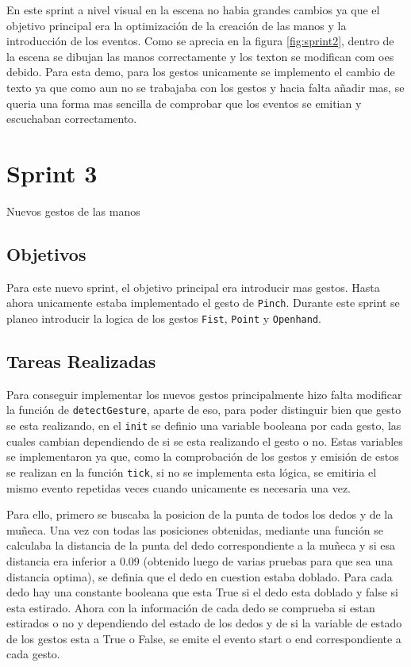 \documentclass[a4paper, 12pt]{book}
\begin{document}
En este sprint a nivel visual en la escena no habia grandes cambios ya que el objetivo principal era la optimización de la creación de las manos y la introducción de los eventos. 
Como se aprecia en la figura \ref{fig:sprint2}, dentro de la escena se dibujan las manos correctamente y los texton se modifican com oes debido. Para esta demo, para los gestos unicamente se implemento el cambio de texto ya que 
como aun no se trabajaba con los gestos y hacia falta añadir mas, se queria una forma mas sencilla de comprobar que los eventos se emitian y escuchaban correctamento. 

\section{Sprint 3}
\label{sec:sprint3}
Nuevos gestos de las manos

\subsection{Objetivos}
\label{subsec:objetivo-principal3}
Para este nuevo sprint, el objetivo principal era introducir mas gestos. Hasta ahora unicamente estaba implementado el gesto de \texttt{Pinch}.
Durante este sprint se planeo introducir la logica de los gestos \texttt{Fist}, \texttt{Point} y \texttt{Openhand}.

\subsection{Tareas Realizadas}
\label{subsec:implementacion3}
Para conseguir implementar los nuevos gestos principalmente hizo falta modificar la función de \texttt{detectGesture}, aparte de eso, para poder distinguir bien que gesto se esta realizando, en el \texttt{init} se definio una variable booleana por cada gesto, las cuales cambian dependiendo de si se esta realizando el gesto o no. Estas variables se implementaron ya que, como la comprobación de los gestos y emisión de estos se realizan en la función \texttt{tick}, si no se implementa esta lógica, se emitiria el mismo evento repetidas veces cuando unicamente es necesaria una vez.

Para ello, primero se buscaba la posicion de la punta de todos los dedos y de la muñeca. Una vez con todas las posiciones obtenidas, mediante una función se calculaba la distancia de la punta del dedo correspondiente a la muñeca y si esa distancia era inferior a 0.09 (obtenido luego de varias pruebas para que sea una distancia optima), se definia que el dedo en cuestion estaba doblado.
Para cada dedo hay una constante booleana que esta True si el dedo esta doblado y false si esta estirado. Ahora con la información de cada dedo se comprueba si estan estirados o no y dependiendo del estado de los dedos y de si la variable de estado de los gestos esta a True o False, se emite el evento start o end correspondiente a cada gesto. 
\end{document}
